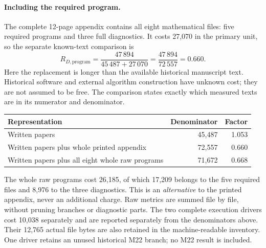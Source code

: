 \documentclass[11pt,a4paper]{article}
\begin{document}
\newpage
\paragraph{Including the required program.}
The complete 12-page appendix contains all eight mathematical files: five
required programs and three full diagnostics. It costs 27,070 in the primary
unit, so the separate known-text comparison is
\[
 R_{D,\mathrm{program}}=\frac{47\,894}{45\,487+27\,070}
 =\frac{47\,894}{72\,557}=\mathbf{0.660}.
\]
Here the replacement is longer than the available historical manuscript text.
Historical software and external algorithm construction have unknown cost;
they are not assumed to be free. The comparison states exactly which measured
texts are in its numerator and denominator.

\begin{center}\begin{tabular}{p{.67\linewidth}rr}\toprule
Representation & Denominator & Factor\\\midrule
Written papers & 45,487 & 1.053\\
Written papers plus whole printed appendix & 72,557 & 0.660\\
Written papers plus all eight whole raw programs & 71,672 & 0.668\\\bottomrule
\end{tabular}\end{center}
The whole raw programs cost 26,185, of which 17,209 belongs to the five
required files and 8,976 to the three diagnostics. This is an
\emph{alternative} to the printed appendix, never an additional charge.
Raw metrics are summed file by file, without pruning branches or diagnostic
parts. The two complete execution drivers cost 10,038 separately and are
reported separately from the denominators above. Their 12,765 actual file bytes
are also retained in the machine-readable inventory. One driver retains an
unused historical M22 branch; no M22 result is included.
\end{document}
